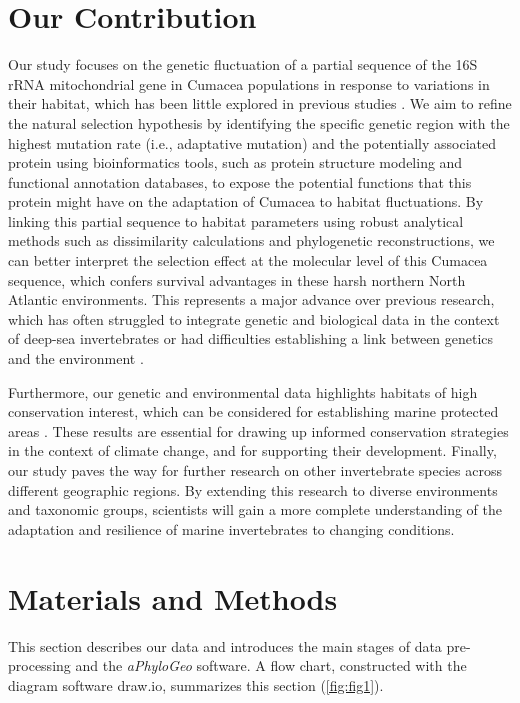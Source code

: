 \section{Our Contribution}\label{contribution}
Our study focuses on the genetic fluctuation of a partial sequence of the 16S rRNA mitochondrial gene in Cumacea populations in response to variations in their habitat, which has been little explored in previous studies \citep{grassle1992deep, rex2000latitudinal}. We aim to refine the natural selection hypothesis by identifying the specific genetic region with the highest mutation rate (i.e., adaptative mutation) and the potentially associated protein using bioinformatics tools, such as protein structure modeling and functional annotation databases, to expose the potential functions that this protein might have on the adaptation of Cumacea to habitat fluctuations. By linking this partial sequence to habitat parameters using robust analytical methods such as dissimilarity calculations and phylogenetic reconstructions, we can better interpret the selection effect at the molecular level of this Cumacea sequence, which confers survival advantages in these harsh northern North Atlantic environments. This represents a major advance over previous research, which has often struggled to integrate genetic and biological data in the context of deep-sea invertebrates \citep{etter1990population, vrijenhoek2009cryptic} or had difficulties establishing a link between genetics and the environment \citep{manel2003landscape, balkenhol2009statistical}.

Furthermore, our genetic and environmental data highlights habitats of high conservation interest, which can be considered for establishing marine protected areas \citep{levin2009ecological}. These results are essential for drawing up informed conservation strategies in the context of climate change, and for supporting their development. Finally, our study paves the way for further research on other invertebrate species across different geographic regions. By extending this research to diverse environments and taxonomic groups, scientists will gain a more complete understanding of the adaptation and resilience of marine invertebrates to changing conditions. 

\section{Materials and Methods}\label{materials-methods}
This section describes our data and introduces the main stages of data pre-processing and the \textit{aPhyloGeo} software. A flow chart, constructed with the diagram software draw.io, summarizes this section (\autoref{fig:fig1}).

